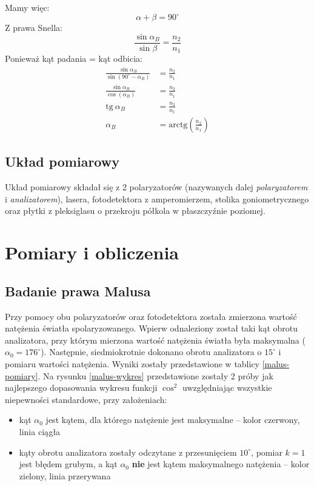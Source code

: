 \documentclass[a4paper]{article}
\begin{document}
Mamy więc:
\[ \alpha + \beta = 90^\circ \]
Z prawa Snella:
\[ 	\frac{\sin \alpha_{B}}{\sin \beta} = \frac{n_2}{n_1} \]
Ponieważ kąt padania = kąt odbicia: 
\begin{align*}
 	\frac{\sin \alpha_{B}}{\sin (90^\circ - \alpha_B)} &= \frac{n_2}{n_1} \\
	\frac{\sin \alpha_{B}}{\cos (\alpha_B)} &= \frac{n_2}{n_1} \\
	\text{tg} \ \alpha_{B} &= \frac{n_2}{n_1} \\
	\alpha_B &= \text{arctg} \left(\frac{n_2}{n_1}\right)
\end{align*}
\subsection{Układ pomiarowy}
Układ pomiarowy składał się z 2 polaryzatorów (nazywanych dalej \textit{polaryzatorem} i \textit{analizatorem}), lasera, fotodetektora z amperomierzem, stolika goniometrycznego oraz płytki z pleksiglasu o przekroju półkola w płaszczyźnie poziomej.


\section{Pomiary i obliczenia}
\subsection{Badanie prawa Malusa}
Przy pomocy obu polaryzatorów oraz fotodetektora została zmierzona wartość natężenia światła spolaryzowanego.
Wpierw odnaleziony został taki kąt obrotu analizatora, przy którym mierzona wartość natężenia światła była maksymalna ($\alpha_0 = 176^\circ$).
Następnie, siedmiokrotnie dokonano obrotu analizatora o $15^\circ$ i pomiaru wartości natężenia.
Wyniki zostały przedstawione w tablicy \ref{malus-pomiary}. 
Na rysunku \ref{malus-wykres} przedstawione zostały 2 próby jak najlepszego dopasowania wykresu funkcji $\cos^2$ uwzględniając wszystkie niepewności standardowe, przy założeniach:
\begin{itemize}
	\item kąt $\alpha_0$ jest kątem, dla którego natężenie jest maksymalne -- kolor czerwony, linia ciągła
	\item kąty obrotu analizatora zostały odczytane z przesunięciem $10^\circ$, pomiar $k=1$ jest błędem grubym, a kąt $\alpha_0$ \textbf{nie} jest kątem maksymalnego natężenia -- kolor zielony, linia przerywana
\end{itemize}
\end{document}
